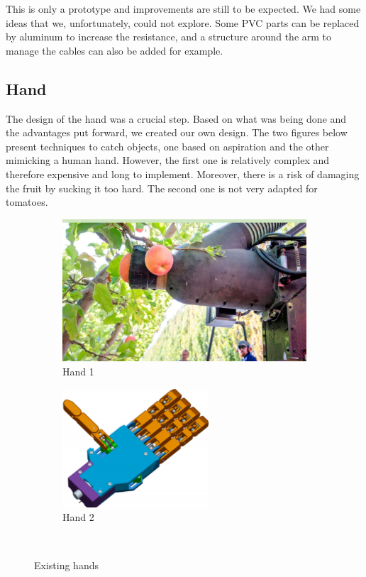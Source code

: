 This is only a prototype and improvements are still to be expected. We had some ideas that we, unfortunately, could not explore. Some PVC parts can be replaced by aluminum to increase the resistance, and a structure around the arm to manage the cables can also be added for example.

\subsection{Hand}
\label{Han}

The design of the hand was a crucial step. Based on what was being done and the advantages put forward, we created our own design. The two figures below present techniques to catch objects, one based on aspiration\cite{Abundant} and the other mimicking a human hand\cite{Prehenseur}. However, the first one is relatively complex and therefore expensive and long to implement. Moreover, there is a risk of damaging the fruit by sucking it too hard. The second one is not very adapted for tomatoes. 
\begin{figure}[H]
    \begin{subfigure}{.5\linewidth}
        \centering
        \includegraphics[scale = 0.7]{Images/Section03/hand1.png}
        \caption{Hand 1}
        \label{fig:hand1}
    \end{subfigure}%
    \begin{subfigure}{.5\linewidth}
        \centering
        \includegraphics[width= 0.6\textwidth,scale = 0.8]{Images/Section03/hand2.png}
        \caption{Hand 2}
        \label{fig:hand2}
    \end{subfigure}\\[1ex]
    \caption{Existing hands}
    \label{fig:ExistingHands}
\end{figure}

